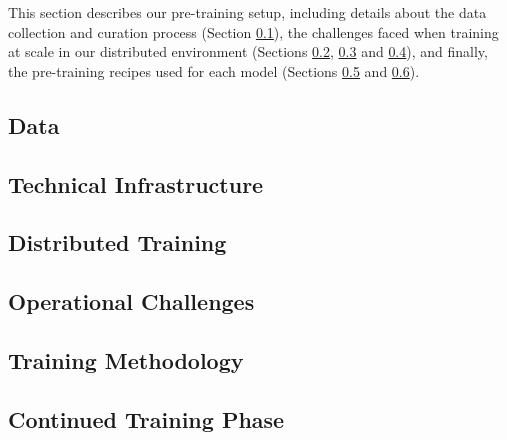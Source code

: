 This section describes our pre-training setup, including details about the data collection and curation process (Section \ref{subsec:pretrain_data}), the challenges faced when training at scale in our distributed environment (Sections \ref{subsec:infra}, \ref{subsec:parallelism} and \ref{subsec:operational_challenges}), and finally, the pre-training recipes used for each model (Sections \ref{subsec:pretrain_method} and \ref{subsec:annealing}).

\subsection{Data}
\label{subsec:pretrain_data}


\clearpage
\subsection{Technical Infrastructure}
\label{subsec:infra}


\subsection{Distributed Training}
\label{subsec:parallelism}


\subsection{Operational Challenges}
\label{subsec:operational_challenges}


\subsection{Training Methodology}
\label{subsec:pretrain_method}


\subsection{Continued Training Phase}
\label{subsec:annealing}
